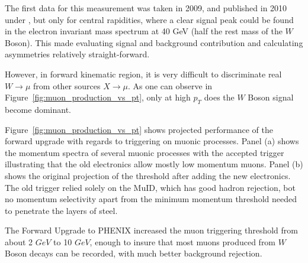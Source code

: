 The first data for this measurement was taken in 2009, and published in 2010
under \cite{Adare2010}, but only for central rapidities, where a clear signal
peak could be found in the electron invariant mass spectrum at 40 GeV (half the
rest mass of the $W$ Boson). This made evaluating signal and background
contribution and calculating asymmetries relatively straight-forward. 

However, in forward kinematic region, it is very difficult to discriminate
real $W\rightarrow\mu$ from other sources $X\rightarrow\mu$. As one can observe
in Figure~\ref{fig:muon_production_vs_pt}, only at high $p_T$ does the $W$ Boson
signal become dominant. 

Figure~\ref{fig:muon_production_vs_pt} shows projected performance of the
forward upgrade with regards to triggering on muonic processes. Panel (a) shows
the momentum spectra of several muonic processes with the accepted trigger
illustrating that the old electronics allow mostly low momentum muons. Panel (b)
shows the original projection of the threshold after adding the new electronics.
The old trigger relied solely on the MuID, which has good hadron rejection, bot
no momentum selectivity apart from the minimum momentum threshold needed to
penetrate the layers of steel.

The Forward Upgrade to PHENIX increased the muon triggering threshold from about
2 $GeV$ to 10 $GeV$, enough to insure that most muons produced from $W$ Boson
decays can be recorded, with much better background rejection. 


